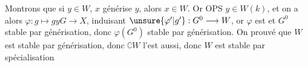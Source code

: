 Montrons que si $y\in W$, $x$ générise $y$, alors $x\in W$. Or OPS $y\in W(k)$, et on a alors $\varphi:g\longmapsto gy$\quad $G\longrightarrow X$, induisant $\unsure{\varphi'|g'}:G^0\longrightarrow W$, or $\varphi$ est  et $G^0$ stable par générisation, donc $\varphi(G^0)$ stable par générisation. On  prouvé que $W$ est stable par générisation, donc $\complement W$ l'est aussi, donc $W$ est stable par spécialisation

